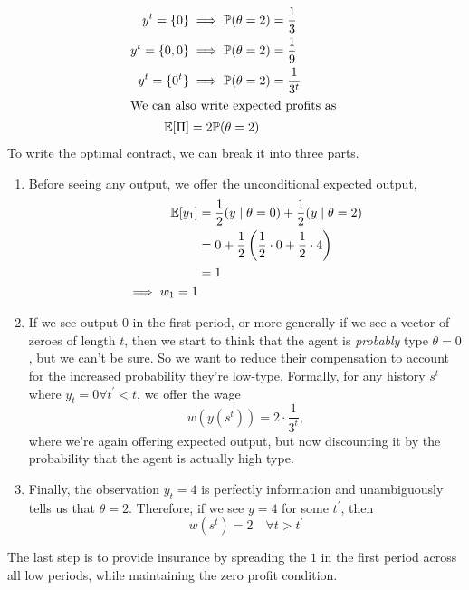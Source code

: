 \begin{enumerate}[label=\alph*)]
\begin{align*}
    y^t = \{0\} &\implies \mathbb{P}(\theta = 2) = \frac{1}{3}\\
    y^t = \{0, 0\} &\implies \mathbb{P}(\theta = 2) = \frac{1}{9}\\
    y^t = \{0^t\} &\implies \mathbb{P}(\theta = 2) = \frac{1}{3^t}\\
    \intertext{We can also write expected profits as }
    \mathbb{E}[\Pi] &= 2 \mathbb{P} (\theta = 2)
  \end{align*}
  To write the optimal contract, we can break it into three parts.
\begin{enumerate}
  \item
  Before seeing any output, we offer the unconditional expected output,
  \begin{align*}
    \mathbb{E}[y_1] &= \frac{1}{2}(y \mid \theta = 0) + \frac{1}{2} (y \mid \theta = 2)\\
            &= 0 + \frac{1}{2} \left(\frac{1}{2} \cdot 0 + \frac{1}{2} \cdot 4\right)\\
            &= 1\\
    \implies w_1 = 1
  \end{align*}
\item If we see output $0$ in the first period, or more generally if we see a vector of zeroes of length $t$, then we start to think that the agent is \emph{probably} type $\theta = 0$, but we can't be sure. So we want to reduce their compensation to account for the increased probability they're low-type. Formally, for any history $s^t$ where $y_t = 0 \forall  t^\prime < t$, we offer the wage
  \[
w(y(s^t)) = 2 \cdot \frac{1}{3^t},
\]
where we're again offering expected output, but now discounting it by the probability that the agent is actually high type.
\item Finally, the observation $y_t = 4$ is perfectly information and unambiguously tells us that $\theta =2$. Therefore, if we see $y = 4$ for some $t^\prime$, then
  \[
w(s^t) = 2 \quad \forall t > t^\prime
  \]
  \end{enumerate}
  The last step is to provide insurance by spreading the $1$ in the first period across all low periods, while maintaining the zero profit condition.
\end{enumerate}
